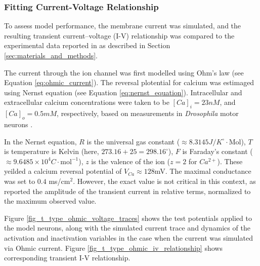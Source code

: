 \documentclass[../main.tex]{subfiles}
\begin{document}

\subsubsection{Fitting Current-Voltage Relationship}

To assess model performance, the membrane current was simulated, and the resulting transient current–voltage (I-V) relationship was compared to the experimental data reported in \textcite{jeongCaa1TFlyTtype2015} as described in Section \ref{sec:materials_and_methods}.

The current through the ion channel was first modelled using Ohm's law (see Equation \ref{eq:ohmic_current}). The reversal plotential for calcium was estimaged using Nernst equation
(see Equation \ref{eq:nernst_equation}). Intracellular and extracellular calcium concentrations were taken to be $[Ca]_i=23 nM$, and $[Ca]_o = 0.5 mM$, respectively, based on measurements in \textit{Drosophila} motor neurons \parencite{macleodFastCalciumSignals2002}.

In the Nernst equation, $R$ is the universal gas constant
($\approx 8.3145 J/K^\circ \cdot \text{Mol}$), $T$ is temperature is Kelvin (here, $273.16+25=298.16^{\circ}$), $F$ is Faraday's constant
($\approx 9.6485 \times 10^{4} C\cdot \text{mol}^{-1}$), $z$ is the valence of the ion ($z=2$ for $Ca^{2+}$). These yeilded a calcium reversal potential of $V_{Ca}\approx 128$mV. The maximal conductance was set to $0.4$ ms/cm$^2$. However, the exact value is not critical in this context, as \textcite{jeongCaa1TFlyTtype2015} reported the amplitude of the transient current in relative terms, normalized to the maximum observed value.

Figure \ref{fig_t_type_ohmic_voltage_traces} shows the test potentials applied to the model neurons, along with the simulated current trace and dynamics of the activation and inactivation variables in the case when the current was simulated via Ohmic current. Figure \ref{fig_t_type_ohmic_iv_relationship} shows corresponding transient I-V relationship.
\end{document}
